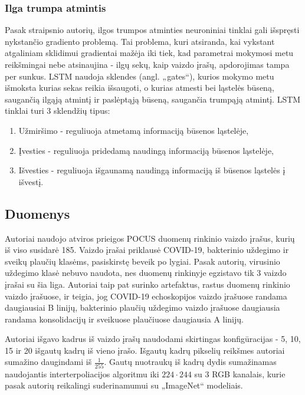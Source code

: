 \documentclass[fleqn]{VUMIFKompMagistrinis}
\begin{document}
\subsubsection{Ilga trumpa atmintis}\label{sec:lstm_sub}
Pasak straipsnio autorių, ilgos trumpos atminties neuroniniai tinklai gali išspręsti nykstančio gradiento problemą. Tai problema, kuri atsiranda, kai vykstant atgaliniam sklidimui gradientai mažėja iki tiek, kad parametrai mokymosi metu reikšmingai nebe atsinaujina - ilgų sekų, kaip vaizdo įrašų, apdorojimas tampa per sunkus. LSTM naudoja sklendes (angl. „gates“), kurios mokymo metu išmoksta kurias sekas reikia išsaugoti, o kurias atmesti bei ląstelės būseną, saugančią ilgąją atmintį ir paslėptąją būseną, saugančia trumpąją atmintį. LSTM tinklai turi 3 sklendžių tipus: 
\begin{enumerate}
    \item Užmiršimo - reguliuoja atmetamą informaciją būsenos ląstelėje,
    \item Įvesties - reguliuoja pridedamą naudingą informaciją būsenos ląstelėje,
    \item Išvesties - reguliuoja išgaunamą naudingą informaciją iš būsenos ląstelės į išvestį. 
\end{enumerate}

\subsection{Duomenys}\label{sec:duomenys3}
Autoriai naudojo atviros prieigos POCUS duomenų rinkinio vaizdo įrašus, kurių iš viso susidarė 185. Vaizdo įrašai priklausė COVID-19, bakterinio uždegimo ir sveikų plaučių klasėms, pasiskirstę beveik po lygiai. Pasak autorių, virusinio uždegimo klasė nebuvo naudota, nes duomenų rinkinyje egzistavo tik 3 vaizdo įrašai su šia liga. Autoriai taip pat surinko artefaktus, rastus duomenų rinkinio vaizdo įrašuose, ir teigia, jog COVID-19 echoskopijos vaizdo įrašuose randama daugiausiai B linijų, bakterinio plaučių uždegimo vaizdo įrašuose daugiausia randama konsolidacijų ir sveikuose plaučiuose daugiausia A linijų.
\par
Autoriai išgavo kadrus iš vaizdo įrašų naudodami skirtingas konfigūracijas - 5, 10, 15 ir 20 išgautų kadrų iš vieno įrašo. Išgautų kadrų pikselių reikšmes autoriai sumažino daugindami iš \(\frac{1}{255}\). Gautų nuotraukų iš kadrų dydis sumažinamas naudojantis interterpoliacijos algoritmu iki \(224 \cdot 244\) su 3 RGB kanalais, kurie pasak autorių reikalingi suderinamumui su „ImageNet“ modeliais.
\end{document}
